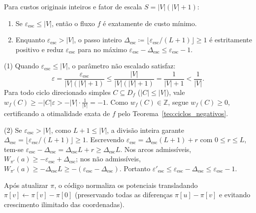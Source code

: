 \begin{prop}\label{prop:cat_integralidade}
Para custos originais inteiros e fator de escala $S = |V|(|V| + 1)$:
\begin{enumerate}
    \item Se $\varepsilon_{\text{esc}} \le |V|$, então o fluxo $f$ é exatamente de custo mínimo.
    \item Enquanto $\varepsilon_{\text{esc}} > |V|$, o passo inteiro $\Delta_{\text{esc}} \coloneqq \lfloor \varepsilon_{\text{esc}} / (L + 1) \rfloor \ge 1$ é estritamente positivo e reduz $\varepsilon_{\text{esc}}$ para no máximo $\varepsilon_{\text{esc}} - \Delta_{\text{esc}} \le \varepsilon_{\text{esc}} - 1$.
\end{enumerate}
\end{prop}

\begin{demonstracao}
(1) Quando $\varepsilon_{\text{esc}} \le |V|$, o parâmetro não escalado satisfaz:
\begin{equation*}
    \varepsilon = \frac{\varepsilon_{\text{esc}}}{|V|(|V| + 1)} \le \frac{|V|}{|V|(|V| + 1)} = \frac{1}{|V| + 1} < \frac{1}{|V|}.
\end{equation*}
Para todo ciclo direcionado simples $C \subseteq D_f$ ($|C| \le |V|$), vale $w_f(C) \ge -|C|\varepsilon > -|V| \cdot \frac{1}{|V|} = -1$. Como $w_f(C) \in \mathbb{Z}$, segue $w_f(C) \ge 0$, certificando a otimalidade exata de $f$ pelo Teorema~\ref{teo:ciclos_negativos}.

\medskip
\noindent (2) Se $\varepsilon_{\text{esc}} > |V|$, como $L + 1 \le |V|$, a divisão inteira garante $\Delta_{\text{esc}} = \lfloor \varepsilon_{\text{esc}} / (L+1) \rfloor \ge 1$. Escrevendo $\varepsilon_{\text{esc}} = \Delta_{\text{esc}}(L+1) + r$ com $0 \le r \le L$, tem-se $\varepsilon_{\text{esc}} - \Delta_{\text{esc}} = \Delta_{\text{esc}} L + r \ge \Delta_{\text{esc}} L$. Nos arcos admissíveis, $W_{\pi'}(a) \ge -\varepsilon_{\text{esc}} + \Delta_{\text{esc}}$; nos não admissíveis, $W_{\pi'}(a) \ge -\Delta_{\text{esc}} L \ge -(\varepsilon_{\text{esc}} - \Delta_{\text{esc}})$. Portanto $\varepsilon'_{\text{esc}} \le \varepsilon_{\text{esc}} - \Delta_{\text{esc}} \le \varepsilon_{\text{esc}} - 1$.
\end{demonstracao}

Após atualizar $\pi$, o código normaliza os potenciais transladando $\pi[v] \leftarrow \pi[v] - \pi[0]$ (preservando todas as diferenças $\pi[u] - \pi[v]$ e evitando crescimento ilimitado das coordenadas).


